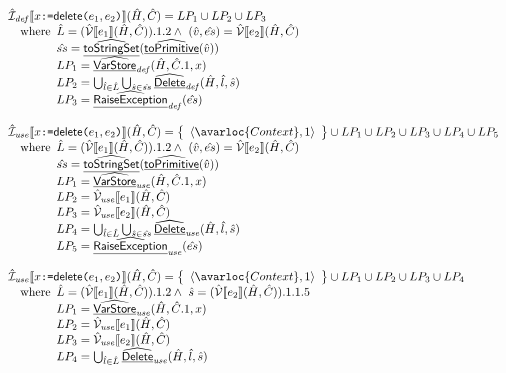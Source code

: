 \[\begin{array}{l}
  \aI_{\it def}\lbr x \TT{:=} \SF{delete}\TT{(}e_1,e_2\TT{)} \rbr(\hat{H},\hat{C})
  = LP_1\cup LP_2 \cup LP_3 \\
  \quad\wherec{
    \hat{L}=(\aV\lbr e_1\rbr(\hat{H},\hat{C})).1.2
    \land\ (\hat{v}, \hat{es}) = \aV\lbr e_2\rbr(\hat{H},\hat{C}) \\
    \hat{ss} = \ahf{toStringSet}(\ahf{toPrimitive}(\hat{v})) \\
    LP_1 = \ahf{VarStore}_{\it def}(\hat{H}, \hat{C}.1, x)\\
    LP_2 = \bigcup_{\hat{l}\in\hat{L}} \bigcup_{\hat{s}\in\hat{ss}} \ahf{Delete}_{\it def}(\hat{H},\hat{l},\hat{s}) \\
    LP_3 = \ahf{RaiseException}_{\it def}(\hat{es})
  }
  \\\\
  \aI_{\it use}\lbr x \TT{:=} \SF{delete}\TT{(}e_1,e_2\TT{)} \rbr(\hat{H},\hat{C})
  = \set{\langle \avarloc{Context}, 1\rangle} \cup LP_1 \cup LP_2\cup LP_3 \cup LP_4 \cup LP_5 \\
  \quad\wherec{
    \hat{L}=(\aV\lbr e_1\rbr(\hat{H},\hat{C})).1.2
    \land\ (\hat{v}, \hat{es}) = \aV\lbr e_2\rbr(\hat{H},\hat{C}) \\
    \hat{ss} = \ahf{toStringSet}(\ahf{toPrimitive}(\hat{v})) \\
    LP_1 = \ahf{VarStore}_{\it use}(\hat{H}, \hat{C}.1, x)\\
    LP_2 = \aV_{\it use}\lbr e_1\rbr(\hat{H},\hat{C})\\
    LP_3 = \aV_{\it use}\lbr e_2\rbr(\hat{H},\hat{C})\\
    LP_4 = \bigcup_{\hat{l}\in\hat{L}} \bigcup_{\hat{s}\in\hat{ss}} \ahf{Delete}_{\it use}(\hat{H},\hat{l},\hat{s}) \\
    LP_5 = \ahf{RaiseException}_{\it use}(\hat{es})
  }
  \\\\

  \aI_{\it use}\lbr x \TT{:=} \SF{delete}\TT{(}e_1,e_2\TT{)} \rbr(\hat{H},\hat{C})
  = \set{\langle \avarloc{Context}, 1\rangle} \cup LP_1 \cup LP_2\cup LP_3 \cup LP_4\\
  \quad\wherec{
    \hat{L}=(\aV\lbr e_1\rbr(\hat{H},\hat{C})).1.2
    \land\ \hat{s}=(\aV\lbr e_2\rbr(\hat{H},\hat{C})).1.1.5\\
    LP_1 = \ahf{VarStore}_{\it use}(\hat{H}, \hat{C}.1, x)\\
    LP_2 = \aV_{\it use}\lbr e_1\rbr(\hat{H},\hat{C})\\
    LP_3 = \aV_{\it use}\lbr e_2\rbr(\hat{H},\hat{C})\\
    LP_4 = \bigcup_{\hat{l}\in\hat{L}}\ahf{Delete}_{\it use}(\hat{H},\hat{l},\hat{s})
  }
  \\\\
\end{array}
\]
